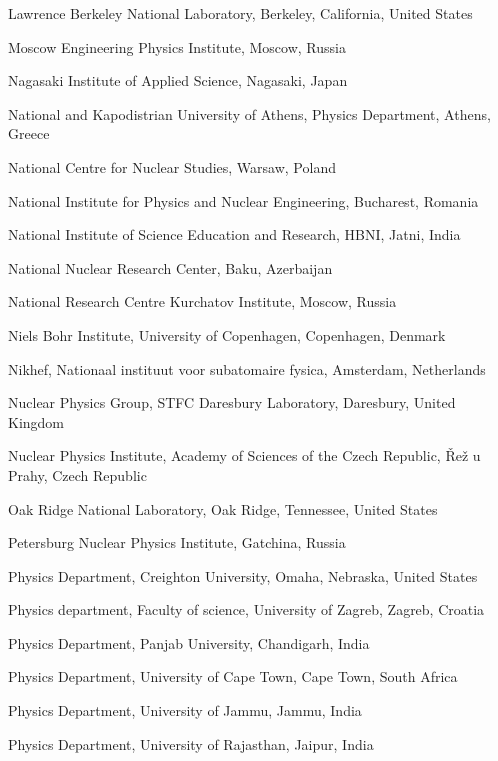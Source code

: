 \begin{flushleft}
\begin{Authlist}
\item {}Lawrence Berkeley National Laboratory, Berkeley, California, United States
\item {}Moscow Engineering Physics Institute, Moscow, Russia
\item {}Nagasaki Institute of Applied Science, Nagasaki, Japan
\item {}National and Kapodistrian University of Athens, Physics Department, Athens, Greece
\item {}National Centre for Nuclear Studies, Warsaw, Poland
\item {}National Institute for Physics and Nuclear Engineering, Bucharest, Romania
\item {}National Institute of Science Education and Research, HBNI, Jatni, India
\item {}National Nuclear Research Center, Baku, Azerbaijan
\item {}National Research Centre Kurchatov Institute, Moscow, Russia
\item {}Niels Bohr Institute, University of Copenhagen, Copenhagen, Denmark
\item {}Nikhef, Nationaal instituut voor subatomaire fysica, Amsterdam, Netherlands
\item {}Nuclear Physics Group, STFC Daresbury Laboratory, Daresbury, United Kingdom
\item {}Nuclear Physics Institute, Academy of Sciences of the Czech Republic, \v{R}e\v{z} u Prahy, Czech Republic
\item {}Oak Ridge National Laboratory, Oak Ridge, Tennessee, United States
\item {}Petersburg Nuclear Physics Institute, Gatchina, Russia
\item {}Physics Department, Creighton University, Omaha, Nebraska, United States
\item {}Physics department, Faculty of science, University of Zagreb, Zagreb, Croatia
\item {}Physics Department, Panjab University, Chandigarh, India
\item {}Physics Department, University of Cape Town, Cape Town, South Africa
\item {}Physics Department, University of Jammu, Jammu, India
\item {}Physics Department, University of Rajasthan, Jaipur, India

\end{Authlist}
\end{flushleft}
